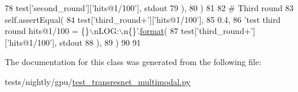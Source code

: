 \begin{DoxyCode}
78                 test[\textcolor{stringliteral}{'second\_round'}][\textcolor{stringliteral}{'hits@1/100'}], stdout
79             ),
80         )
81 
82         \textcolor{comment}{# Third round}
83         self.assertEqual(
84             test[\textcolor{stringliteral}{'third\_round+'}][\textcolor{stringliteral}{'hits@1/100'}],
85             0.4,
86             \textcolor{stringliteral}{'test third round hits@1/100 = \{\}\(\backslash\)nLOG:\(\backslash\)n\{\}'}.\hyperlink{namespaceparlai_1_1chat__service_1_1services_1_1messenger_1_1shared__utils_a32e2e2022b824fbaf80c747160b52a76}{format}(
87                 test[\textcolor{stringliteral}{'third\_round+'}][\textcolor{stringliteral}{'hits@1/100'}], stdout
88             ),
89         )
90 
91 
\end{DoxyCode}


The documentation for this class was generated from the following file\+:\begin{DoxyCompactItemize}
\item 
tests/nightly/gpu/\hyperlink{test__transresnet__multimodal_8py}{test\+\_\+transresnet\+\_\+multimodal.\+py}\end{DoxyCompactItemize}

